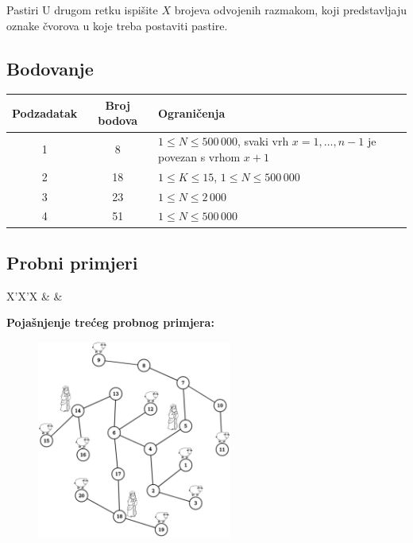 \begin{statement}[
  problempoints=100,
  timelimit=1 sekunda,
  memorylimit=512 MiB,
]{Pastiri}
U drugom retku ispišite $X$ brojeva odvojenih razmakom, koji predstavljaju oznake
čvorova u koje treba postaviti pastire.

\subsection*{Bodovanje}
{\renewcommand{\arraystretch}{1.4}
  \setlength{\tabcolsep}{6pt}
  \begin{tabular}{ccl}
 Podzadatak & Broj bodova & Ograničenja \\ \midrule
  1 & 8 & $1 \le N \le 500\,000$, svaki vrh $x = 1, \dots, n-1$ je povezan s vrhom $x + 1$\\
  2 & 18 & $1 \le K \le 15 $, $1 \le N \le 500\,000$ \\
  3 & 23 & $1 \le N \le 2\,000$ \\
  4 & 51 & $1 \le N \le 500\,000$ \\
\end{tabular}}

\subsection*{Probni primjeri}
\begin{tabularx}{\textwidth}{X'X'X}
 &
 &
\end{tabularx}

\textbf{Pojašnjenje trećeg probnog primjera:}
\begin{figure}[H]
\centering
\includegraphics[width=0.57\textwidth]{img/pastiri_tp.png}
\end{figure}

\end{statement}

